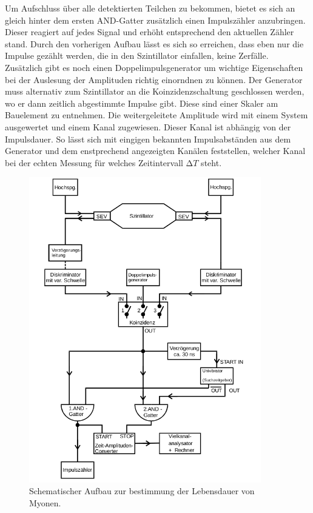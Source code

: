Um Aufschluss über alle detektierten Teilchen zu bekommen, bietet es sich an gleich hinter dem ersten AND-Gatter zusätzlich einen Impulszähler anzubringen. 
Dieser reagiert auf jedes Signal und erhöht entsprechend den aktuellen Zähler stand. Durch den vorherigen Aufbau lässt es sich so erreichen, dass eben nur die Impulse gezählt werden, die 
in den Szintillator einfallen, keine Zerfälle.
\\
\newline
Zusätzlich gibt es noch einen Doppelimpulsgenerator um wichtige Eigenschaften bei der Auslesung der Amplituden 
richtig einorndnen zu können. Der Generator muss alternativ zum Szintillator an die Koinzidenzschaltung geschlossen werden,
wo er dann zeitlich abgestimmte Impulse gibt. Diese sind einer Skaler am Bauelement zu entnehmen. 
Die weitergeleitete Amplitude wird mit einem System ausgewertet und einem Kanal zugewiesen. Dieser Kanal ist abhängig 
von der Impulsdauer. So lässt sich mit eingigen bekannten Impulsabständen aus dem Generator und dem enstprechend angezeigten Kanälen
feststellen, welcher Kanal bei der echten Messung für welches Zeitintervall $\increment T$ steht.











\begin{figure}
    \centering
    \includegraphics[width=0.9\textwidth]{bilder/aufbau.png}
    \caption{Schematischer Aufbau zur bestimmung der Lebensdauer von Myonen. \cite{skript}} 
    \label{fig:1}
\end{figure}
